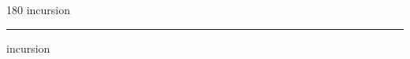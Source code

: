 
\begin{frame}
\begin{center}
\begin{turn}{180}
{\fontsize{2.5cm}{1em}\selectfont incursion}
\end{turn}
\vspace{1em}\par  
\hrule
\vspace{1em}\par  
{\fontsize{2.5cm}{1em}\selectfont incursion}
\end{center}
\end{frame}

